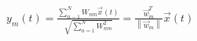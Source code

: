 \documentclass[border=5pt]{standalone}
\begin{document}
  $y_m(t) = \frac{\displaystyle\sum_{n-1}^{N}{W_{nm}\vec{x}(t)}}{\sqrt{\displaystyle\sum_{n=1}^{N}{W_{nm}^2}}} = \frac{\vec{w}_m^T}{\left\|{\vec{w}_m}\right\|}\vec{x}(t)$
\end{document}
